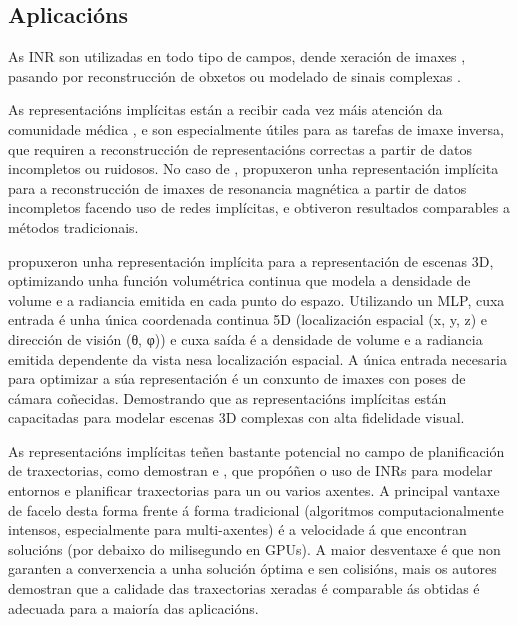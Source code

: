 \subsection{Aplicacións}
\label{subsec:Aplicacións}

As INR son utilizadas en todo tipo de campos, dende xeración de imaxes \cite{reddy2022multiimplicitneuralrepresentationfonts}, pasando por
reconstrucción de obxetos \cite{mildenhall2020nerfrepresentingscenesneural} \cite{mescheder2019occupancynetworkslearning3d} ou modelado de sinais complexas \cite{wu2021iremhighresolutionmagneticresonance}.

As representacións implícitas están a recibir cada vez máis atención da comunidade médica \cite{molaei2023implicitneuralrepresentationmedical}, e son 
especialmente útiles para as tarefas de imaxe inversa, que requiren a reconstrucción de representacións correctas a partir de datos incompletos ou ruidosos. 
No caso de \cite{shen2023nerpimplicitneuralrepresentation}, propuxeron unha representación implícita para a reconstrucción de imaxes de resonancia magnética a partir de datos incompletos facendo uso de redes implícitas, 
e obtiveron resultados comparables a métodos tradicionais.

\cite{mildenhall2020nerfrepresentingscenesneural} propuxeron unha representación implícita para a representación de escenas 3D, 
 optimizando unha función volumétrica continua que modela a densidade de volume e a radiancia emitida en cada punto do espazo.
 Utilizando un MLP, cuxa entrada é unha única coordenada continua 5D (localización espacial (x, y, z) e dirección de visión (θ, φ)) 
 e cuxa saída é a densidade de volume e a radiancia emitida dependente da vista nesa localización espacial. 
A única entrada necesaria para optimizar a súa representación é un conxunto de imaxes con poses de cámara coñecidas. 
Demostrando que as representacións implícitas están capacitadas para modelar escenas 3D complexas con alta fidelidade visual.
 
As representacións implícitas teñen bastante potencial no campo de planificación de traxectorias, como demostran \cite{yu2024neuraltrajectorymodelimplicit} e \cite{trajectinr}, 
que propóñen o uso de INRs para modelar entornos e planificar traxectorias para un ou varios axentes.
A principal vantaxe de facelo desta forma frente á forma tradicional (algoritmos computacionalmente intensos, especialmente para multi-axentes) é a velocidade á que encontran solucións (por debaixo do milisegundo en GPUs).
A maior desventaxe é que non garanten a converxencia a unha solución óptima e sen colisións, mais os autores demostran que a calidade das traxectorias xeradas é comparable ás obtidas é adecuada para a maioría das aplicacións.

